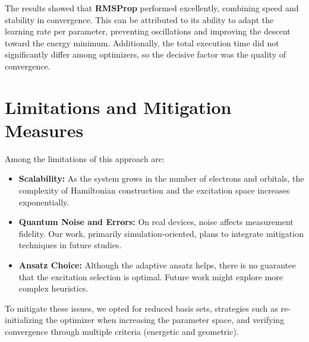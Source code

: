 The results showed that \textbf{RMSProp} performed excellently, combining speed and stability in convergence. This can be attributed to its ability to adapt the learning rate per parameter, preventing oscillations and improving the descent toward the energy minimum. Additionally, the total execution time did not significantly differ among optimizers, so the decisive factor was the quality of convergence.

\section{Limitations and Mitigation Measures}

Among the limitations of this approach are:
\begin{itemize}
    \item \textbf{Scalability:} As the system grows in the number of electrons and orbitals, the complexity of Hamiltonian construction and the excitation space increases exponentially.
    \item \textbf{Quantum Noise and Errors:} On real devices, noise affects measurement fidelity. Our work, primarily simulation-oriented, plans to integrate mitigation techniques in future studies.
    \item \textbf{Ansatz Choice:} Although the adaptive ansatz helps, there is no guarantee that the excitation selection is optimal. Future work might explore more complex heuristics.
\end{itemize}

To mitigate these issues, we opted for reduced basis sets, strategies such as re-initializing the optimizer when increasing the parameter space, and verifying convergence through multiple criteria (energetic and geometric).
